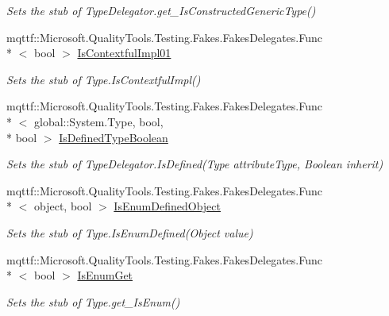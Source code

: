 \begin{DoxyCompactItemize}
\begin{DoxyCompactList}\small\item\em Sets the stub of Type\-Delegator.\-get\-\_\-\-Is\-Constructed\-Generic\-Type()\end{DoxyCompactList}\item 
mqttf\-::\-Microsoft.\-Quality\-Tools.\-Testing.\-Fakes.\-Fakes\-Delegates.\-Func\\*
$<$ bool $>$ \hyperlink{class_system_1_1_reflection_1_1_fakes_1_1_stub_type_delegator_a155500e1b22115513165714d4c2f1052}{Is\-Contextful\-Impl01}
\begin{DoxyCompactList}\small\item\em Sets the stub of Type.\-Is\-Contextful\-Impl()\end{DoxyCompactList}\item 
mqttf\-::\-Microsoft.\-Quality\-Tools.\-Testing.\-Fakes.\-Fakes\-Delegates.\-Func\\*
$<$ global\-::\-System.\-Type, bool, \\*
bool $>$ \hyperlink{class_system_1_1_reflection_1_1_fakes_1_1_stub_type_delegator_a1c6d432981144986fcd80dcab4bab26f}{Is\-Defined\-Type\-Boolean}
\begin{DoxyCompactList}\small\item\em Sets the stub of Type\-Delegator.\-Is\-Defined(\-Type attribute\-Type, Boolean inherit)\end{DoxyCompactList}\item 
mqttf\-::\-Microsoft.\-Quality\-Tools.\-Testing.\-Fakes.\-Fakes\-Delegates.\-Func\\*
$<$ object, bool $>$ \hyperlink{class_system_1_1_reflection_1_1_fakes_1_1_stub_type_delegator_a88e6cc8de7dff769b730ded96ba68086}{Is\-Enum\-Defined\-Object}
\begin{DoxyCompactList}\small\item\em Sets the stub of Type.\-Is\-Enum\-Defined(\-Object value)\end{DoxyCompactList}\item 
mqttf\-::\-Microsoft.\-Quality\-Tools.\-Testing.\-Fakes.\-Fakes\-Delegates.\-Func\\*
$<$ bool $>$ \hyperlink{class_system_1_1_reflection_1_1_fakes_1_1_stub_type_delegator_ad22298c7d41e5cc895c910c118d279c1}{Is\-Enum\-Get}
\begin{DoxyCompactList}\small\item\em Sets the stub of Type.\-get\-\_\-\-Is\-Enum()\end{DoxyCompactList}\item 

\end{DoxyCompactItemize}
